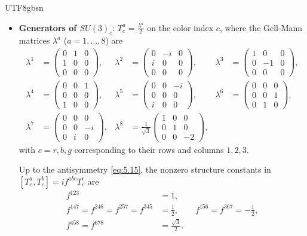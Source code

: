 \documentclass[11pt,a4paper,oneside]{report}
\begin{document}
\begin{CJK*}{UTF8}{gbsn}
\begin{itemize}
\item \textbf{\boldmath Generators of $SU(3)_c$}: $T_c^a=\frac{\lambda^a}2$ on the color index $c$, where the Gell-Mann matrices $\lambda^a$ ($a=1,\ldots,8$) are
\begin{equation*}
\begin{aligned}
\lambda^1&=\begin{pmatrix}0&1&0\\1&0&0\\0&0&0\end{pmatrix},&
\lambda^2&=\begin{pmatrix}0&-i&0\\i&0&0\\0&0&0\end{pmatrix},&
\lambda^3&=\begin{pmatrix}1&0&0\\0&-1&0\\0&0&0\end{pmatrix},\\[6pt]
\lambda^4&=\begin{pmatrix}0&0&1\\0&0&0\\1&0&0\end{pmatrix},&
\lambda^5&=\begin{pmatrix}0&0&-i\\0&0&0\\i&0&0\end{pmatrix},&
\lambda^6&=\begin{pmatrix}0&0&0\\0&0&1\\0&1&0\end{pmatrix},\\[6pt]
\lambda^7&=\begin{pmatrix}0&0&0\\0&0&-i\\0&i&0\end{pmatrix},&
\lambda^8&=\frac1{\sqrt3}\begin{pmatrix}1&0&0\\0&1&0\\0&0&-2\end{pmatrix},
\end{aligned}
\tag{5.44}\label{eq:5.44}
\end{equation*}
with $c=r,b,g$ corresponding to their rows and columns $1,2,3$.

Up to the antisymmetry \eqref{eq:5.15}, the nonzero structure constants in $[T_c^a,T_c^b]=if^{abc}T_c^c$ are
\begin{equation*}
\begin{aligned}
f^{123}&=1,\\[4pt]
f^{147}=f^{246}=f^{257}=f^{345}&=\tfrac12,\qquad
f^{156}=f^{367}=-\tfrac12,\\[4pt]
f^{458}=f^{678}&=\tfrac{\sqrt3}{2}.
\end{aligned}
\tag{5.45}\label{eq:5.45}
\end{equation*}


\end{itemize}
\end{CJK*}
\end{document}
